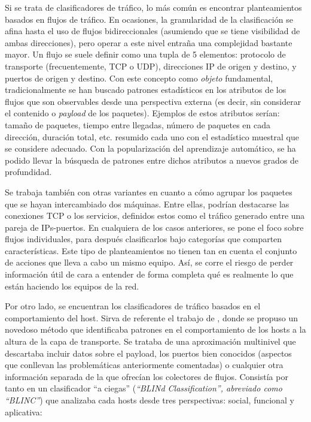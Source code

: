 Si se trata de clasificadores de tráfico, lo más común es encontrar planteamientos basados en flujos de tráfico.
En ocasiones, la granularidad de la clasificación se afina hasta el uso de flujos bidireccionales (asumiendo que se tiene visibilidad de ambas direcciones), pero operar a este nivel entraña una complejidad bastante mayor.
Un flujo se suele definir como una tupla de 5 elementos: protocolo de transporte (frecuentemente, TCP o UDP), direcciones IP de origen y destino, y puertos de origen y destino.
Con este concepto como \emph{objeto} fundamental, tradicionalmente se han buscado patrones estadísticos en los atributos de los flujos que son observables desde una perspectiva externa (es decir, sin considerar el contenido o \emph{payload} de los paquetes).
Ejemplos de estos atributos serían: tamaño de paquetes, tiempo entre llegadas, número de paquetes en cada dirección, duración total, etc. resumido cada uno con el estadístico muestral que se considere adecuado.
Con la popularización del aprendizaje automático, se ha podido llevar la búsqueda de patrones entre dichos atributos a nuevos grados de profundidad.

Se trabaja también con otras variantes en cuanto a cómo agrupar los paquetes que se hayan intercambiado dos máquinas.
Entre ellas, podrían destacarse las conexiones TCP o los servicios, definidos estos como el tráfico generado entre una pareja de IPs-puertos.
En cualquiera de los casos anteriores, se pone el foco sobre flujos individuales, para después clasificarlos bajo categorías que comparten características.
Este tipo de planteamientos no tienen tan en cuenta el conjunto de acciones que lleva a cabo un mismo equipo.
Así, se corre el riesgo de perder información útil de cara a entender de forma completa qué es realmente lo que están haciendo los equipos de la red.

Por otro lado, se encuentran los clasificadores de tráfico basados en el comportamiento del host.
Sirva de referente el trabajo de \cite{KPF05}, donde se propuso un novedoso método que identificaba patrones en el comportamiento de los hosts a la altura de la capa de transporte.
Se trataba de una aproximación multinivel que descartaba incluir datos sobre el payload, los puertos bien conocidos (aspectos que conllevan las problemáticas anteriormente comentadas) o cualquier otra información separada de la que ofrecían los colectores de flujos.
Consistía por tanto en un clasificador ``a ciegas'' (\emph{``BLINd Classification'', abreviado como ``BLINC''}) que analizaba cada hosts desde tres perspectivas: social, funcional y aplicativa:

